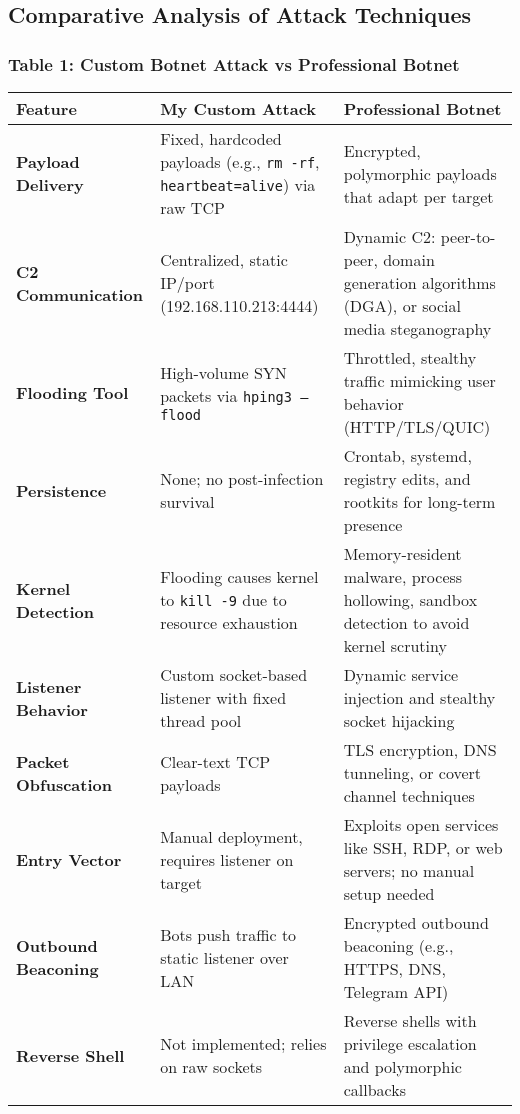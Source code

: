\documentclass{article}
\begin{document}
\subsection*{Comparative Analysis of Attack Techniques}
\subsubsection*{Table 1: Custom Botnet Attack vs Professional Botnet}
\begin{table}[h!]
\centering
\renewcommand{\arraystretch}{1.4}
\begin{tabular}{|p{4.2cm}|p{5.5cm}|p{5.5cm}|}
\hline
\rowcolor{blue!15}
\textbf{Feature} & \textbf{My Custom Attack} & \textbf{Professional Botnet} \\
\hline
\textbf{Payload Delivery} & Fixed, hardcoded payloads (e.g., \texttt{rm -rf}, \texttt{heartbeat=alive}) via raw TCP & Encrypted, polymorphic payloads that adapt per target \\
\hline
\textbf{C2 Communication} & Centralized, static IP/port (192.168.110.213:4444) & Dynamic C2: peer-to-peer, domain generation algorithms (DGA), or social media steganography \\
\hline
\textbf{Flooding Tool} & High-volume SYN packets via \texttt{hping3 --flood} & Throttled, stealthy traffic mimicking user behavior (HTTP/TLS/QUIC) \\
\hline
\textbf{Persistence} & None; no post-infection survival & Crontab, systemd, registry edits, and rootkits for long-term presence \\
\hline
\textbf{Kernel Detection} & Flooding causes kernel to \texttt{kill -9} due to resource exhaustion & Memory-resident malware, process hollowing, sandbox detection to avoid kernel scrutiny \\
\hline
\textbf{Listener Behavior} & Custom socket-based listener with fixed thread pool & Dynamic service injection and stealthy socket hijacking \\
\hline
\textbf{Packet Obfuscation} & Clear-text TCP payloads & TLS encryption, DNS tunneling, or covert channel techniques \\
\hline
\textbf{Entry Vector} & Manual deployment, requires listener on target & Exploits open services like SSH, RDP, or web servers; no manual setup needed \\
\hline
\textbf{Outbound Beaconing} & Bots push traffic to static listener over LAN & Encrypted outbound beaconing (e.g., HTTPS, DNS, Telegram API) \\
\hline
\textbf{Reverse Shell} & Not implemented; relies on raw sockets & Reverse shells with privilege escalation and polymorphic callbacks \\

\end{tabular}
\end{table}
\end{document}
